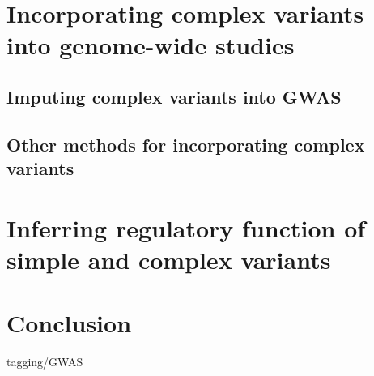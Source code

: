\section{Incorporating complex variants into genome-wide studies}

\subsection{Imputing complex variants into GWAS}

\subsection{Other methods for incorporating complex variants}

\section{Inferring regulatory function of simple and complex variants}

\section{Conclusion}











tagging/GWAS
